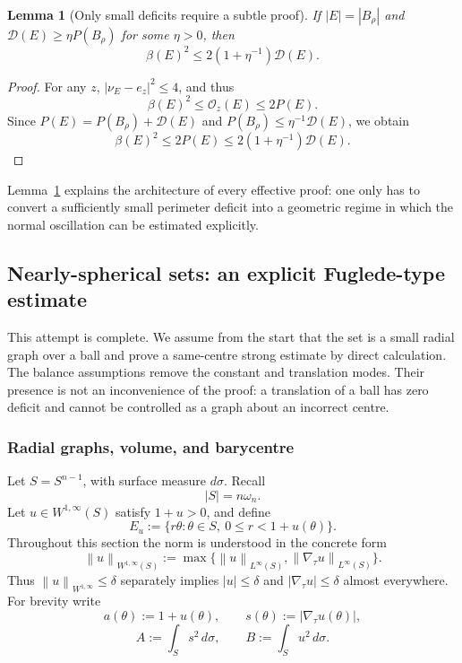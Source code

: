 \documentclass[11pt]{amsart}
\newtheorem{lemma}[theorem]{Lemma}
\theoremstyle{definition}
\newcommand{\norm}[1]{\left\|#1\right\|}
\newcommand{\Per}{P}
\newcommand{\osc}{\mathcal O}
\newcommand{\Def}{\mathcal D}
\begin{document}
\begin{lemma}[Only small deficits require a subtle proof]\label{lem:large}
If \(|E|=|B_\rho|\) and
\(\Def(E)\ge\eta\Per(B_\rho)\) for some \(\eta>0\), then
\[
   \beta(E)^2\le 2(1+\eta^{-1})\Def(E).
\tag{2.7}\label{eq:large-branch}
\]
\end{lemma}

\begin{proof}
For any \(z\), \(|\nu_E-e_z|^2\le4\), and thus
\[
   \beta(E)^2\le\osc_z(E)\le2\Per(E).
\]
Since \(\Per(E)=\Per(B_\rho)+\Def(E)\) and
\(\Per(B_\rho)\le\eta^{-1}\Def(E)\), we obtain
\[
   \beta(E)^2\le2\Per(E)
   \le2(1+\eta^{-1})\Def(E).
\]
\end{proof}

Lemma~\ref{lem:large} explains the architecture of every effective proof:
one only has to convert a sufficiently small perimeter deficit into a
geometric regime in which the normal oscillation can be estimated explicitly.

\subsection{Nearly-spherical sets: an explicit Fuglede-type estimate}\label{app-sec:graphs}

This attempt is complete.  We assume from the start that the set is a small
radial graph over a ball and prove a same-centre strong estimate by direct
calculation.  The balance assumptions remove the constant and translation
modes.  Their presence is not an inconvenience of the proof: a translation
of a ball has zero deficit and cannot be controlled as a graph about an
incorrect centre.

\subsubsection{Radial graphs, volume, and barycentre}

Let \(S=S^{n-1}\), with surface measure \(d\sigma\).  Recall
\[
   |S|=n\omega_n.
\tag{3.1}\label{eq:sphere-measure}
\]
Let \(u\in W^{1,\infty}(S)\) satisfy \(1+u>0\), and define
\[
   E_u:=\{r\theta:\theta\in S,\ 0\le r<1+u(\theta)\}.
\tag{3.2}\label{eq:radial-set}
\]
Throughout this section the norm is understood in the concrete form
\[
   \norm{u}_{W^{1,\infty}(S)}
   :=\max\{\norm{u}_{L^\infty(S)},
           \norm{\nabla_\tau u}_{L^\infty(S)}\}.
\]
Thus \(\norm{u}_{W^{1,\infty}}\le\delta\) separately implies
\(|u|\le\delta\) and \(|\nabla_\tau u|\le\delta\) almost everywhere.
For brevity write
\[
   a(\theta):=1+u(\theta),\qquad
   s(\theta):=|\nabla_\tau u(\theta)|,
\]
\[
   A:=\int_Ss^2\,d\sigma,\qquad
   B:=\int_Su^2\,d\sigma.
\tag{3.3}\label{eq:AB}
\]
\end{document}
